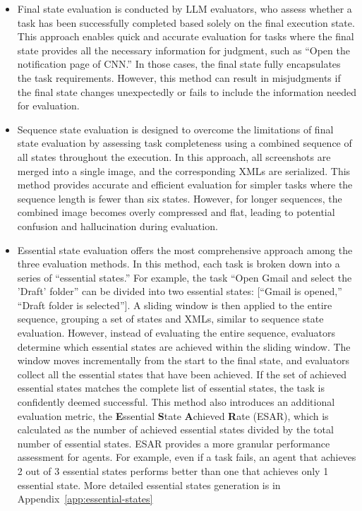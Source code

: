 \documentclass[11pt]{article}
\begin{document}
\begin{itemize}[leftmargin=2mm]
\item Final state evaluation is conducted by LLM evaluators, who assess whether a task has been successfully completed based solely on the final execution state. This approach enables quick and accurate evaluation for tasks where the final state provides all the necessary information for judgment, such as ``Open the notification page of CNN.'' In those cases, the final state fully encapsulates the task requirements. However, this method can result in misjudgments if the final state changes unexpectedly or fails to include the information needed for evaluation.
\item Sequence state evaluation is designed to overcome the limitations of final state evaluation by assessing task completeness using a combined sequence of all states throughout the execution. In this approach, all screenshots are merged into a single image, and the corresponding XMLs are serialized. This method provides accurate and efficient evaluation for simpler tasks where the sequence length is fewer than six states. However, for longer sequences, the combined image becomes overly compressed and flat, leading to potential confusion and hallucination during evaluation.
\item Essential state evaluation offers the most comprehensive approach among the three evaluation methods. In this method, each task is broken down into a series of ``essential states.'' For example, the task ``Open Gmail and select the 'Draft' folder'' can be divided into two essential states: [``Gmail is opened,'' ``Draft folder is selected'']. A sliding window is then applied to the entire sequence, grouping a set of states and XMLs, similar to sequence state evaluation. However, instead of evaluating the entire sequence, evaluators determine which essential states are achieved within the sliding window. The window moves incrementally from the start to the final state, and evaluators collect all the essential states that have been achieved. If the set of achieved essential states matches the complete list of essential states, the task is confidently deemed successful. This method also introduces an additional evaluation metric, the \textbf{E}ssential \textbf{S}tate \textbf{A}chieved \textbf{R}ate (ESAR), which is calculated as the number of achieved essential states divided by the total number of essential states. ESAR provides a more granular performance assessment for agents. For example, even if a task fails, an agent that achieves 2 out of 3 essential states performs better than one that achieves only 1 essential state. More detailed essential states generation is in Appendix~\ref{app:essential-states}
\end{itemize}
\end{document}
